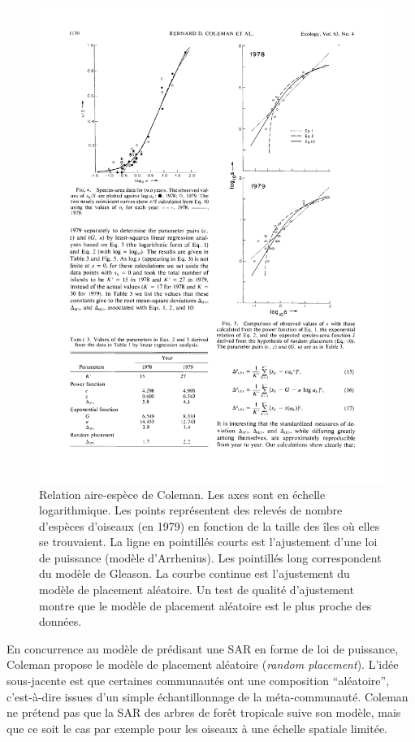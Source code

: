 \documentclass[
  11pt,
  french,
  a4paper,
  extrafontsizes,onecolumn,openright
  ]{memoir}
\begin{document}
\begin{figure}

{\centering \includegraphics[width=0.8\linewidth]{images/Coleman1982} 

}

\caption{Relation aire-espèce de Coleman. Les axes sont en échelle logarithmique. Les points représentent des relevés de nombre d'espèces d'oiseaux (en 1979) en fonction de la taille des îles où elles se trouvaient. La ligne en pointillés courts est l'ajustement d'une loi de puissance (modèle d'Arrhenius). Les pointillés long correspondent du modèle de Gleason. La courbe continue est l'ajustement du modèle de placement aléatoire. Un test de qualité d'ajustement montre que le modèle de placement aléatoire est le plus proche des données.}\label{fig:Coleman1982}
\end{figure}

\normalsize

En concurrence au modèle de \textcite{Preston1962} prédisant une SAR en forme de loi de puissance, Coleman \autocite*{Coleman1981,Coleman1982} propose le modèle de placement aléatoire (\emph{random placement}).
L'idée sous-jacente est que certaines communautés ont une composition ``aléatoire'', c'est-à-dire issues d'un simple échantillonnage de la méta-communauté.
Coleman ne prétend pas que la SAR des arbres de forêt tropicale suive son modèle, mais que ce soit le cas par exemple pour les oiseaux à une échelle spatiale limitée.
\end{document}
